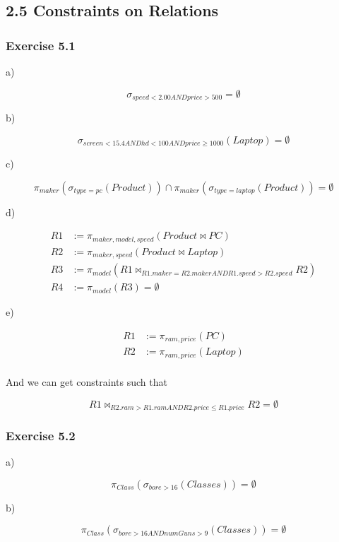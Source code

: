 \subsection*{2.5 Constraints on Relations}

\subsubsection*{Exercise 5.1}

a)

$$
\sigma_{speed < 2.00 AND price > 500} = \emptyset
$$

b)

$$
\sigma_{screen < 15.4 AND hd < 100 AND
price \geq 1000}(Laptop) = \emptyset$$

c)

$$
\pi_{maker}(\sigma_{type=pc}(Product))
\cap \pi_{maker}(\sigma_{type=laptop}(
Product)) = \emptyset
$$

d)

\begin{align*}
  R1 &:= \pi_{maker, model, speed}(Product \bowtie PC) \\
  R2 &:= \pi_{maker, speed}(Product \bowtie Laptop) \\
  R3 &:= \pi_{model}(R1 \bowtie_{R1.maker=R2.maker AND 
         R1.speed > R2.speed} R2) \\
  R4 &:= \pi_{model}(R3) = \emptyset
\end{align*}

e)

\begin{align*}
  R1 &:= \pi_{ram, price}(PC) \\
  R2 &:= \pi_{ram, price}(Laptop) \\
\end{align*}

And we can get constraints such that

$$
R1 \bowtie_{R2.ram > R1.ram AND
R2.price \leq R1.price} R2 = \emptyset
$$

\subsubsection*{Exercise 5.2}

a)

$$
\pi_{Class}(\sigma_{bore > 16}(Classes))
= \emptyset
$$

b)

$$
\pi_{Class}(\sigma_{bore > 16
AND numGuns > 9}(Classes))= \emptyset
$$


